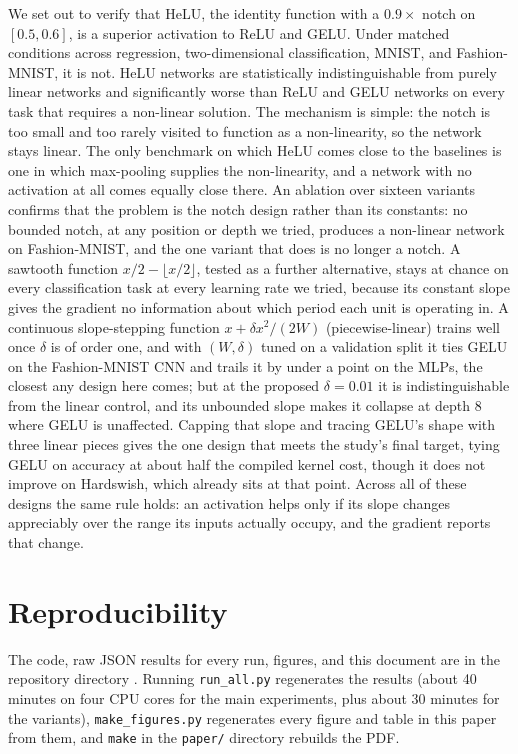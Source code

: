 \documentclass[11pt]{article}
\begin{document}
We set out to verify that HeLU, the identity function with a $0.9\times$ notch on $[0.5,0.6]$, is a
superior activation to ReLU and GELU. Under matched conditions across regression, two-dimensional
classification, MNIST, and Fashion-MNIST, it is not. HeLU networks are statistically indistinguishable
from purely linear networks and significantly worse than ReLU and GELU networks on every task that
requires a non-linear solution. The mechanism is simple: the notch is too small and too rarely visited to
function as a non-linearity, so the network stays linear. The only benchmark on which HeLU comes close
to the baselines is one in which max-pooling supplies the non-linearity, and a network with no
activation at all comes equally close there. An ablation over sixteen variants confirms that the
problem is the notch design rather than its constants: no bounded notch, at any position or depth we
tried, produces a non-linear network on Fashion-MNIST, and the one variant that does is no longer a
notch. A sawtooth function $x/2-\lfloor x/2\rfloor$, tested as a further alternative, stays at chance
on every classification task at every learning rate we tried, because its constant slope gives the
gradient no information about which period each unit is operating in. A continuous slope-stepping
function $x+\delta x^2/(2W)$ (piecewise-linear) trains well once $\delta$ is of order one, and with
$(W,\delta)$ tuned on a validation split it ties GELU on the Fashion-MNIST CNN and trails it by under
a point on the MLPs, the closest any design here comes; but at the proposed $\delta=0.01$ it is
indistinguishable from the linear control, and its unbounded slope makes it collapse at depth 8 where
GELU is unaffected. Capping that slope and tracing GELU's shape with three linear pieces gives the one
design that meets the study's final target, tying GELU on accuracy at about half the compiled kernel
cost, though it does not improve on Hardswish, which already sits at that point. Across all of these
designs the same rule holds: an
activation helps only if its slope changes appreciably over the range its inputs actually occupy, and
the gradient reports that change.

\section*{Reproducibility}

The code, raw JSON results for every run, figures, and this document are in the repository directory
. Running \texttt{run\_all.py} regenerates the results (about
40 minutes on four CPU cores for the main experiments, plus about 30 minutes for the variants),
\texttt{make\_figures.py} regenerates every figure and table in this paper from them, and
\texttt{make} in the \texttt{paper/} directory rebuilds the PDF.



\end{document}
